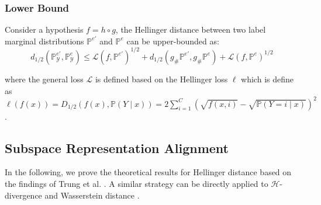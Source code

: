 \subsubsection{Lower Bound}
\begin{theorem}
\label{theorem:single_lower_bound_A}
\cite{phung2021learning} Consider a hypothesis $f=h\circ g$, the Hellinger distance between two label marginal distributions $\mathbb{P}^{e'}$ and $\mathbb{P}^{e}$ can be upper-bounded as: 
\begin{equation}
d_{1/2}\left(\mathbb{P}^{e'}_\mathcal{Y},\mathbb{P}^{e}_\mathcal{Y}\right) \leq 
\mathcal{L}\left ( f,\mathbb{P}^{e'} \right )^{1/2}+
d_{1/2}\left ( g_{\#}\mathbb{P}^{e'},g_{\#}\mathbb{P}^{e} \right )+
\mathcal{L}\left ( f,\mathbb{P}^{e} \right )^{1/2}
\end{equation}

where the general loss $\mathcal{L}$ is defined based on the Hellinger loss $\ell$ which is define as $\ell\left ( f(x) \right )=D_{1/2}\left ( f(x),\mathbb{P}(Y\mid x) \right )=2\sum_{i=1}^C\left ( \sqrt{f(x,i)}-\sqrt{\mathbb{P}(Y=i\mid x)} \right )^2$.
\end{theorem}

\subsection{Subspace Representation Alignment}

In the following, we prove the theoretical results for Hellinger distance based on the findings of Trung et al. \cite{phung2021learning}. A similar strategy can be directly applied to $\mathcal{H}$-divergence \cite{zhao2019learning} and Wasserstein distance \cite{le2021lamda}.

